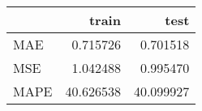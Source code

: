 \begin{tabular}{lrr}
\toprule
{} &      train &       test \\
\midrule
MAE  &   0.715726 &   0.701518 \\
MSE  &   1.042488 &   0.995470 \\
MAPE &  40.626538 &  40.099927 \\
\bottomrule
\end{tabular}
